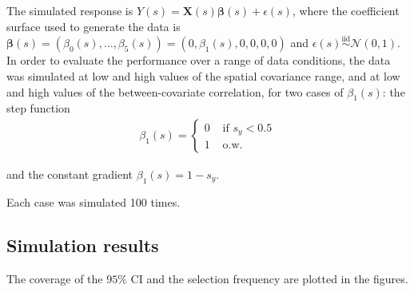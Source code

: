 \documentclass[authoryear, review, 11pt]{elsarticle}
\begin{document}
		The simulated response is $Y(s) = \bm{X}(s) \bm{\beta}(s) + \epsilon(s)$, where the coefficient surface used to generate the data is $\bm{\beta}(s) = \left( \beta_0(s), \dots, \beta_5(s) \right) = \left( 0, \beta_1(s), 0, 0, 0, 0 \right)$ and $\epsilon(s) \overset{\mbox{iid}}{\sim} \mathcal{N} \left( 0, 1 \right)$.\\
		
		In order to evaluate the performance over a range of data conditions, the data was simulated at low and high values of the spatial covariance range, and at low and high values of the between-covariate correlation, for two cases of $\beta_1(s)$: the step function		
		\begin{eqnarray}
			\beta_1(s) = \begin{cases} 0 &\mbox{ if } s_y<0.5 \\ 1 &\mbox{ o.w.} \end{cases}
		\end{eqnarray}
		
		and the constant gradient $\beta_1(s) = 1-s_y$.
			
		Each case was simulated 100 times.\\
	
	\subsection{Simulation results}
		The coverage of the $95\%$ CI and the selection frequency are plotted in the figures.\\
		
\end{document}
